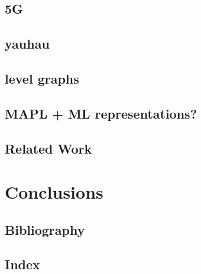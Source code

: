 \documentclass{report}
\begin{document}
\section{5G}
\section{yauhau}
\section{level graphs}
\section{MAPL + ML representations?}

\section{Related Work}

\chapter{Conclusions} 


\section{Bibliography} 
\section*{Index} 
\end{document}
